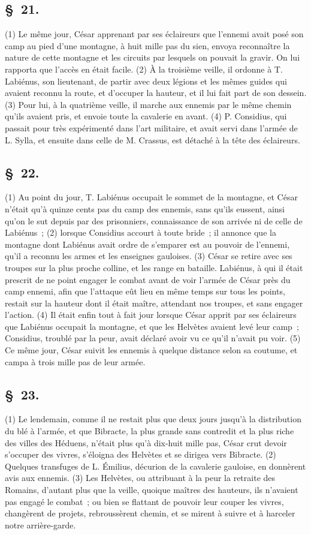 \documentclass[french,twoside]{book} %
\begin{document}
\subsection[{§ 21.}]{ \textsc{§ 21.} }
\noindent (1) Le même jour, César apprenant par ses éclaireurs que l’ennemi avait posé son camp au pied d’une montagne, à huit mille pas du sien, envoya reconnaître la nature de cette montagne et les circuits par lesquels on pouvait la gravir. On lui rapporta que l’accès en était facile. (2) À la troisième veille, il ordonne à T. Labiénus, son lieutenant, de partir avec deux légions et les mêmes guides qui avaient reconnu la route, et d’occuper la hauteur, et il lui fait part de son dessein. (3) Pour lui, à la quatrième veille, il marche aux ennemis par le même chemin qu’ils avaient pris, et envoie toute la cavalerie en avant. (4) P. Considius, qui passait pour très expérimenté dans l’art militaire, et avait servi dans l’armée de L. Sylla, et ensuite dans celle de M. Crassus, est détaché à la tête des éclaireurs.
\subsection[{§ 22.}]{ \textsc{§ 22.} }
\noindent (1) Au point du jour, T. Labiénus occupait le sommet de la montagne, et César n’était qu’à quinze cents pas du camp des ennemis, sans qu’ils eussent, ainsi qu’on le sut depuis par des prisonniers, connaissance de son arrivée ni de celle de Labiénus ; (2) lorsque Considius accourt à toute bride ; il annonce que la montagne dont Labiénus avait ordre de s’emparer est au pouvoir de l’ennemi, qu’il a reconnu les armes et les enseignes gauloises. (3) César se retire avec ses troupes sur la plus proche colline, et les range en bataille. Labiénus, à qui il était prescrit de ne point engager le combat avant de voir l’armée de César près du camp ennemi, afin que l’attaque eût lieu en même temps sur tous les points, restait sur la hauteur dont il était maître, attendant nos troupes, et sans engager l’action. (4) Il était enfin tout à fait jour lorsque César apprit par ses éclaireurs que Labiénus occupait la montagne, et que les Helvètes avaient levé leur camp ; Considius, troublé par la peur, avait déclaré avoir vu ce qu’il n’avait pu voir. (5) Ce même jour, César suivit les ennemis à quelque distance selon sa coutume, et campa à trois mille pas de leur armée.
\subsection[{§ 23.}]{ \textsc{§ 23.} }
\noindent (1) Le lendemain, comme il ne restait plus que deux jours jusqu’à la distribution du blé à l’armée, et que Bibracte, la plus grande sans contredit et la plus riche des villes des Héduens, n’était plus qu’à dix-huit mille pas, César crut devoir s’occuper des vivres, s’éloigna des Helvètes et se dirigea vers Bibracte. (2) Quelques transfuges de L. Émilius, décurion de la cavalerie gauloise, en donnèrent avis aux ennemis. (3) Les Helvètes, ou attribuant à la peur la retraite des Romains, d’autant plus que la veille, quoique maîtres des hauteurs, ils n’avaient pas engagé le combat ; ou bien se flattant de pouvoir leur couper les vivres, changèrent de projets, rebroussèrent chemin, et se mirent à suivre et à harceler notre arrière-garde.
\end{document}
